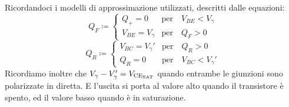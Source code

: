 \documentclass[../template]{subfiles}
\begin{document}
Ricordandoci i modelli di approssimazione utilizzati, descritti dalle equazioni:
\[
    Q_F \coloneqq
    \begin{cases}
        Q_+ = 0 &\text{per} \quad V_{BE} < V_\gamma
        \\
        V_{BE} = V_\gamma &\text{per} \quad Q_F > 0
    \end{cases}
\]
\[
    Q_R \coloneqq
    \begin{cases}
        V_{BC} = V_\gamma' & \text{per} \quad  Q_R > 0\\
        Q_R = 0 & \text{per} \quad V_{BC} < V_\gamma'
    \end{cases}
\]
Ricordiamo inoltre che $V_\gamma - V_\gamma' = V_{\text{CE}_{\text{SAT}}}$ quando entrambe le giunzioni sono polarizzate in diretta. E l'uscita si porta al valore alto quando il transistore è spento, ed il valore basso quando è in saturazione.
\end{document}
